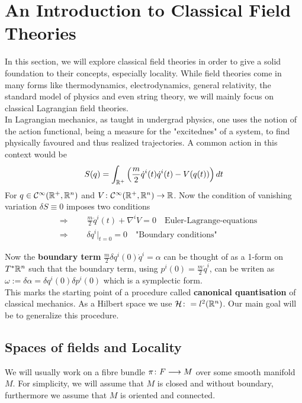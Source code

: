\section{An Introduction to Classical Field Theories}
\label{sec:Classical_FT}
In this section, we will explore classical field theories  in order to give a solid foundation to their concepts, especially locality. While field theories come in many forms like thermodynamics, electrodynamics, general relativity, the standard model of physics and even string theory, we will mainly focus on classical Lagrangian field theories.\\

In Lagrangian mechanics, as taught in undergrad physics, one uses the notion of the action functional, being a measure for the "excitednes" of a system, to find physically favoured and thus realized trajectories. A common action in this context would be
$$ S(q) = \int_{\mathbb{R}^+} \left( \frac{m}{2} \dot q^i(t) \dot q^i(t) - V(q(t)) \right) dt $$
For $q\in \mathcal{C}^{\infty}(\mathbb{R}^+, \mathbb{R}^n)$ and $V\colon\mathcal{C}^{\infty}(\mathbb{R}^+, \mathbb{R}^n) \rightarrow \mathbb{R}$. Now the condition of vanishing variation $\delta S \equiv 0$ imposes two conditions
\begin{align*}
  &\Rightarrow \quad \quad \frac{m}{2} \ddot q^i(t) + \nabla^i V = 0 \quad \text{Euler-Lagrange-equations}\\
  &\Rightarrow \quad \quad \delta q^i \Big|_{t=0} = 0 \quad \text{"Boundary conditions"}
\end{align*}

Now the \textbf{boundary term} $\frac{m}{2}\delta q^i(0) \dot q^i = \alpha$ can be thought of as a 1-form on $T^*\mathbb{R}^n$ such that the boundary term, using $p^i(0) = \frac{m}{2} \dot q^i$, can be writen as $\omega := \delta \alpha = \delta q^i(0) \delta p^i(0)$ which is a symplectic form.\\

This marks the starting point of a procedure called \textbf{canonical quantisation} of classical mechanics. As a Hilbert space we use $\mathcal{H} \colon= l^2(\mathbb{R}^n)$. Our main goal will be to generalize this procedure.\\

\subsection{Spaces of fields and Locality}
We will usually work on a fibre bundle $\pi\colon F \longrightarrow M$ over some smooth manifold $M$. For simplicity, we will assume that $M$ is closed and without boundary, furthermore we assume that $M$ is oriented and connected.

